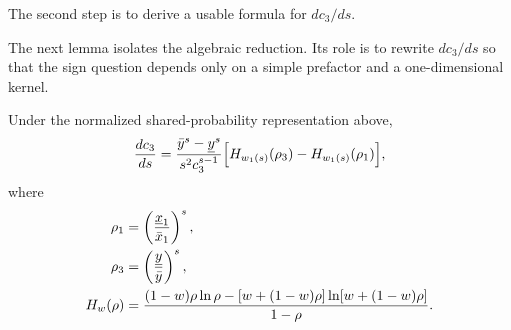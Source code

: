 The second step is to derive a usable formula for $dc_3/ds$.

The next lemma isolates the algebraic reduction. Its role is to rewrite
$dc_3/ds$ so that the sign question depends only on a simple prefactor and a
one-dimensional kernel.

\begin{lemma}
\label{lem:condB_derivative_identity}
Under the normalized shared-probability representation above,
\begin{equation}\label{eq:dc3ds_H}
  \frac{dc_3}{ds}
  = \frac{\bar{y}^s - \underline{y}^s}{s^2 c_3^{s-1}}
    \Bigl[H_{w_1(s)}(\rho_3) - H_{w_1(s)}(\rho_1)\Bigr],
\end{equation}
where
\[
  \begin{aligned}
    \rho_1 &= \left(\frac{\underline{x}_1}{\bar{x}_1}\right)^s, \\
    \rho_3 &= \left(\frac{\underline{y}}{\bar{y}}\right)^s, \\
    H_w(\rho)
      &= \frac{(1-w)\rho\ln\rho
        - [w + (1-w)\rho]\ln[w + (1-w)\rho]}
        {1-\rho}.
  \end{aligned}
\]
\end{lemma}

